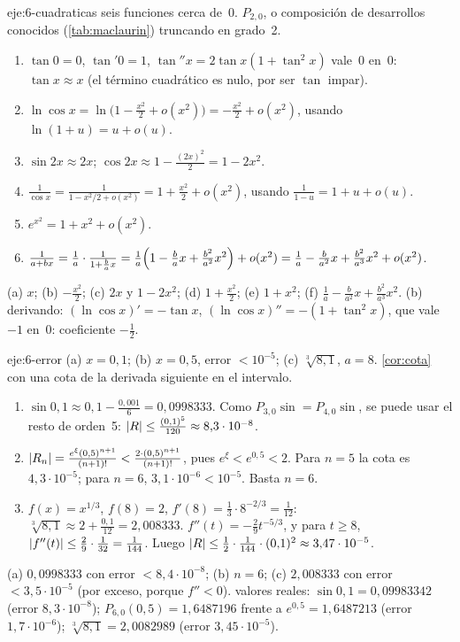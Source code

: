 \begin{solucion}{eje:6-cuadraticas}
\datos seis funciones cerca de~0.
\planteamiento $P_{2,0}$, o composición de desarrollos conocidos (\cref{tab:maclaurin}) truncando en grado~2.
\pasos
\begin{enumerate}[label=(\alph*)]
  \item $\tan0=0$, $\tan'0=1$, $\tan''x=2\tan x(1+\tan^{2}x)$ vale~0 en~0: $\tan x\approx x$ (el término cuadrático es nulo, por ser $\tan$ impar).
  \item $\ln\cos x=\ln\bigl(1-\frac{x^{2}}{2}+o(x^{2})\bigr)=-\frac{x^{2}}{2}+o(x^{2})$, usando $\ln(1+u)=u+o(u)$.
  \item $\sin2x\approx2x$; $\cos2x\approx1-\frac{(2x)^{2}}{2}=1-2x^{2}$.
  \item $\frac{1}{\cos x}=\frac{1}{1-x^{2}/2+o(x^{2})}=1+\frac{x^{2}}{2}+o(x^{2})$, usando $\frac{1}{1-u}=1+u+o(u)$.
  \item $e^{x^{2}}=1+x^{2}+o(x^{2})$.
  \item $\frac{1}{a+bx}=\frac1a\cdot\frac{1}{1+\frac bax}=\frac1a\Bigl(1-\frac bax+\frac{b^{2}}{a^{2}}x^{2}\Bigr)+o(x^{2})=\frac1a-\frac{b}{a^{2}}x+\frac{b^{2}}{a^{3}}x^{2}+o(x^{2})$.
\end{enumerate}
\resultado (a) $x$; (b) $-\frac{x^{2}}{2}$; (c) $2x$ y $1-2x^{2}$; (d) $1+\frac{x^{2}}{2}$; (e) $1+x^{2}$; (f) $\frac1a-\frac{b}{a^{2}}x+\frac{b^{2}}{a^{3}}x^{2}$.
\comprobacion (b) derivando: $(\ln\cos x)'=-\tan x$, $(\ln\cos x)''=-(1+\tan^{2}x)$, que vale $-1$ en~0: coeficiente $-\frac12$.
\end{solucion}

\begin{solucion}{eje:6-error}
\datos (a) $x=0{,}1$; (b) $x=0{,}5$, error $<10^{-5}$; (c) $\sqrt[3]{8{,}1}$, $a=8$.
\planteamiento \cref{cor:cota} con una cota de la derivada siguiente en el intervalo.
\pasos
\begin{enumerate}[label=(\alph*)]
  \item $\sin0{,}1\approx0{,}1-\frac{0{,}001}{6}=0{,}0998333$. Como $P_{3,0}\sin=P_{4,0}\sin$, se puede usar el resto de orden~5: $\lvert R\rvert\le\frac{(0{,}1)^{5}}{120}\approx8{,}3\cdot10^{-8}$.
  \item $\lvert R_n\rvert=\frac{e^{\xi}(0{,}5)^{n+1}}{(n+1)!}<\frac{2\cdot(0{,}5)^{n+1}}{(n+1)!}$, pues $e^{\xi}<e^{0{,}5}<2$. Para $n=5$ la cota es $4{,}3\cdot10^{-5}$; para $n=6$, $3{,}1\cdot10^{-6}<10^{-5}$. Basta $n=6$.
  \item $f(x)=x^{1/3}$, $f(8)=2$, $f'(8)=\frac13\cdot8^{-2/3}=\frac{1}{12}$: $\sqrt[3]{8{,}1}\approx2+\frac{0{,}1}{12}=2{,}008333$. $f''(t)=-\frac29t^{-5/3}$, y para $t\ge8$, $\lvert f''(t)\rvert\le\frac29\cdot\frac{1}{32}=\frac{1}{144}$. Luego $\lvert R\rvert\le\frac{1}{2}\cdot\frac{1}{144}\cdot(0{,}1)^{2}\approx3{,}47\cdot10^{-5}$.
\end{enumerate}
\resultado (a) $0{,}0998333$ con error $<8{,}4\cdot10^{-8}$; (b) $n=6$; (c) $2{,}008333$ con error $<3{,}5\cdot10^{-5}$ (por exceso, porque $f''<0$).
\comprobacion valores reales: $\sin0{,}1=0{,}09983342$ (error $8{,}3\cdot10^{-8}$); $P_{6,0}(0{,}5)=1{,}6487196$ frente a $e^{0{,}5}=1{,}6487213$ (error $1{,}7\cdot10^{-6}$); $\sqrt[3]{8{,}1}=2{,}0082989$ (error $3{,}45\cdot10^{-5}$).
\end{solucion}

